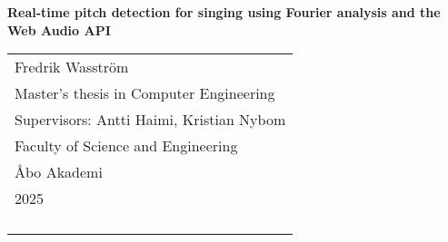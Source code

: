 
\begin{titlepage}
\vspace*{144pt}
\begin{center}
\Huge\bf Real-time pitch detection for singing using Fourier analysis and the Web Audio API
\end{center}
\enlargethispage{3cm}
\vfill

\hfill
\begin{tabular}[t]{l@{}}%
Fredrik Wasström\\ 
Master's thesis in Computer Engineering\\ 
Supervisors: Antti Haimi, Kristian Nybom \\
Faculty of Science and Engineering \\
Åbo Akademi\\ 
2025\\ 
\\
\\
\\
\\
\end{tabular}
\end{titlepage}

